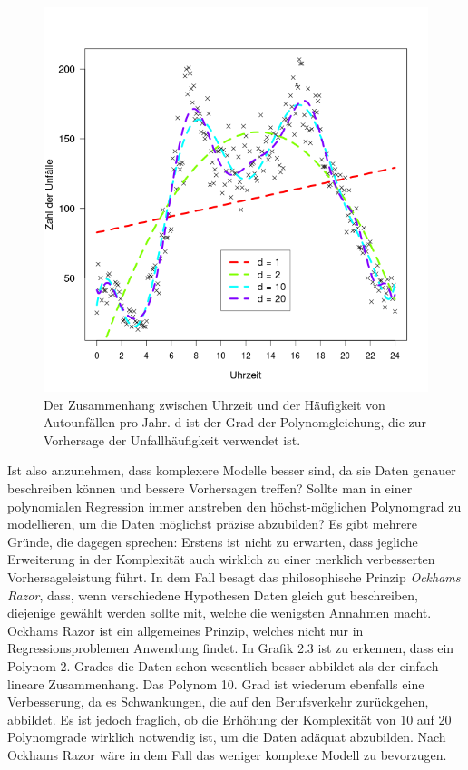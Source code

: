 \begin{figure}[!ht]
  \caption{Der Zusammenhang zwischen Uhrzeit und der Häufigkeit von Autounfällen pro
    Jahr.  d ist der Grad der Polynomgleichung, die zur Vorhersage der
    Unfallhäufigkeit verwendet ist.}  \centering
  \includegraphics[width=1\textwidth]{chapters/svm/poly_2.png}
\end{figure}


Ist also anzunehmen, dass komplexere Modelle besser sind, da sie Daten genauer
beschreiben können und bessere Vorhersagen treffen? Sollte man in einer polynomialen
Regression immer anstreben den höchst-möglichen Polynomgrad zu modellieren, um die
Daten möglichst präzise abzubilden? Es gibt mehrere Gründe, die dagegen sprechen:
Erstens ist nicht zu erwarten, dass jegliche Erweiterung in der Komplexität auch
wirklich zu einer merklich verbesserten Vorhersageleistung führt. In dem Fall besagt
das philosophische Prinzip \emph{Ockhams Razor}, dass, wenn verschiedene Hypothesen
Daten gleich gut beschreiben, diejenige gewählt werden sollte mit, welche die
wenigsten Annahmen macht.  Ockhams Razor ist ein allgemeines Prinzip, welches nicht
nur in Regressionsproblemen Anwendung findet. In Grafik 2.3 ist zu erkennen, dass
ein Polynom 2. Grades die Daten schon wesentlich besser abbildet als der einfach
lineare Zusammenhang. Das Polynom 10. Grad ist wiederum ebenfalls eine Verbesserung,
da es Schwankungen, die auf den Berufsverkehr zurückgehen, abbildet. Es ist jedoch
fraglich, ob die Erhöhung der Komplexität von 10 auf 20 Polynomgrade wirklich
notwendig ist, um die Daten adäquat abzubilden. Nach Ockhams Razor wäre in dem Fall
das weniger komplexe Modell zu bevorzugen.

